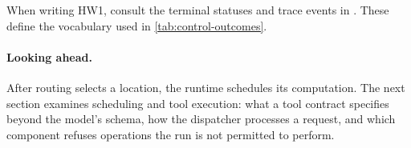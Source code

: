 When writing HW1, consult the terminal statuses and trace events in . These
define the vocabulary used in \cref{tab:control-outcomes}.

\paragraph{Looking ahead.} After routing selects a location, the runtime schedules its computation.
The next section examines scheduling and tool execution: what a tool contract specifies beyond
the model's schema, how the dispatcher processes a request, and which component refuses
operations the run is not permitted to perform.
